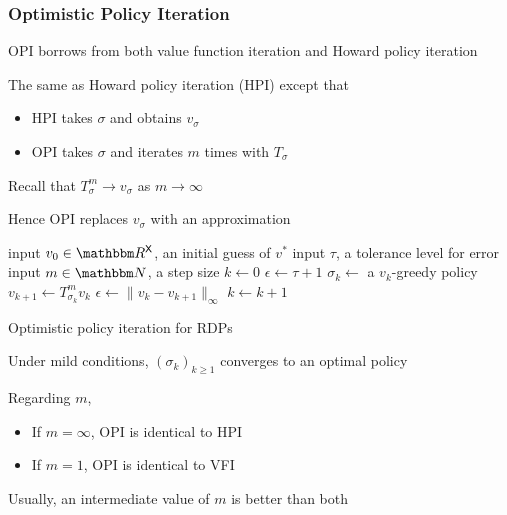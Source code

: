 \begin{frame}
    \frametitle{Optimistic Policy Iteration}

    OPI borrows from both value function iteration and Howard policy iteration

    \vspace{0.5em}
    The same as Howard policy iteration (HPI) except that
    \begin{itemize}
        \item HPI takes $\sigma$ and obtains $v_\sigma$
    \vspace{0.5em}
        \item OPI takes $\sigma$ and iterates $m$ times with $T_{\sigma}$
    \end{itemize}


    \vspace{0.5em}
    Recall that $T^m_{\sigma} \to v_\sigma$ as $m \to \infty$

    \vspace{0.5em}
    \vspace{0.5em}
    Hence OPI replaces $v_\sigma$ with an approximation

\end{frame}


\begin{frame}
    
    {\small
    \begin{algorithm}[H]
        \DontPrintSemicolon
        input $v_0 \in \RR^\Xsf$, an initial guess of $v^*$ \;
        input $\tau$, a tolerance level for error \;
        input $m \in \NN$, a step size \;
        $k \leftarrow 0$ \;
        $\epsilon \leftarrow \tau + 1$ \;
        \While{$\epsilon > \tau $}
        {
            $\sigma_k \leftarrow $ a $v_k$-greedy policy \;
            $v_{k+1} \leftarrow T_{\sigma_k}^m v_k$  \;
            $\epsilon \leftarrow \| v_k - v_{k+1} \|_\infty$ \;
            $k \leftarrow k + 1$ \;
        }
        \caption{Optimistic policy iteration for RDPs}
    \end{algorithm}
    }

\end{frame}


\begin{frame}
    

    Under mild conditions, $(\sigma_k)_{k \geq 1}$ converges to an optimal policy
    \vspace{0.5em}
    \vspace{0.5em}

    Regarding $m$,
    \begin{itemize}
        \item If $m=\infty$, OPI is identical to HPI
    \vspace{0.5em}
        \item If $m=1$, OPI is identical to VFI
    \end{itemize}

    \vspace{0.5em}
    Usually, an intermediate value of $m$ is better than both


\end{frame}

